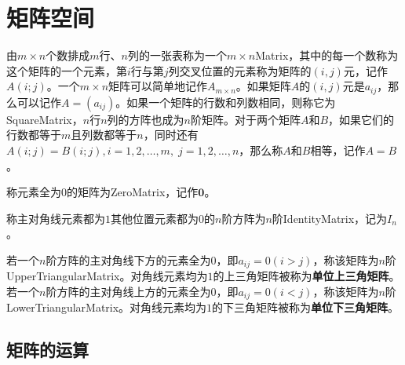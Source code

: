 \section{矩阵空间}
\begin{definition}
	由$m\times n$个数排成$m$行、$n$列的一张表称为一个$m\times n$\gls{Matrix}，其中的每一个数称为这个矩阵的一个元素，第$i$行与第$j$列交叉位置的元素称为矩阵的$(i,j)$元，记作$A(i;j)$。一个$m\times n$矩阵可以简单地记作$A_{m\times n}$。如果矩阵$A$的$(i,j)$元是$a_{ij}$，那么可以记作$A=(a_{ij})$。如果一个矩阵的行数和列数相同，则称它为\gls{SquareMatrix}，$n$行$n$列的方阵也成为$n$阶矩阵。对于两个矩阵$A$和$B$，如果它们的行数都等于$m$且列数都等于$n$，同时还有$A(i;j)=B(i;j),i=1,2,\dots,m,\;j=1,2,\dots,n$，那么称$A$和$B$相等，记作$A=B$。
\end{definition}
\begin{definition}
	称元素全为$0$的矩阵为\gls{ZeroMatrix}，记作$\mathbf{0}$。
\end{definition}
\begin{definition}
	称主对角线元素都为$1$其他位置元素都为$0$的$n$阶方阵为$n$阶\gls{IdentityMatrix}，记为$I_n$。
\end{definition}
\begin{definition}
	若一个$n$阶方阵的主对角线下方的元素全为$0$，即$a_{ij}=0(i>j)$，称该矩阵为$n$阶\gls{UpperTriangularMatrix}。对角线元素均为$1$的上三角矩阵被称为\textbf{单位上三角矩阵}。若一个$n$阶方阵的主对角线上方的元素全为$0$，即$a_{ij}=0(i<j)$，称该矩阵为$n$阶\gls{LowerTriangularMatrix}。对角线元素均为$1$的下三角矩阵被称为\textbf{单位下三角矩阵}。
\end{definition}


\subsection{矩阵的运算}
